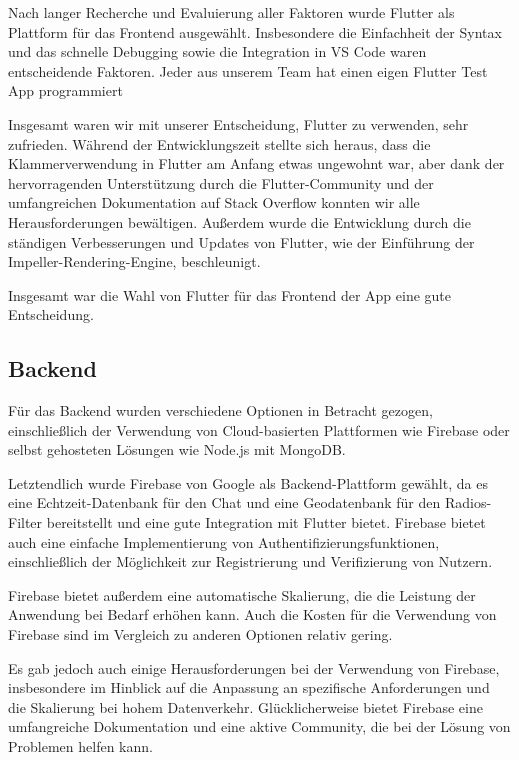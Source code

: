 Nach langer Recherche und Evaluierung aller Faktoren wurde Flutter als Plattform für das Frontend ausgewählt. Insbesondere die Einfachheit der Syntax und das schnelle Debugging sowie die Integration in VS Code waren entscheidende Faktoren. Jeder aus unserem Team hat einen eigen Flutter Test App programmiert \cite{flutter_test_apps}

Insgesamt waren wir mit unserer Entscheidung, Flutter zu verwenden, sehr zufrieden. Während der Entwicklungszeit stellte sich heraus, dass die Klammerverwendung in Flutter am Anfang etwas ungewohnt war, aber dank der hervorragenden Unterstützung durch die Flutter-Community und der umfangreichen Dokumentation auf Stack Overflow konnten wir alle Herausforderungen bewältigen. Außerdem wurde die Entwicklung durch die ständigen Verbesserungen und Updates von Flutter, wie der Einführung der Impeller-Rendering-Engine, beschleunigt. \cite{flutter_impeller}

Insgesamt war die Wahl von Flutter für das Frontend der App eine gute Entscheidung.

\subsection{Backend}

Für das Backend wurden verschiedene Optionen in Betracht gezogen, einschließlich der Verwendung von Cloud-basierten Plattformen wie Firebase oder selbst gehosteten Lösungen wie Node.js mit MongoDB.

Letztendlich wurde Firebase von Google als Backend-Plattform gewählt, da es eine Echtzeit-Datenbank für den Chat und eine Geodatenbank für den Radios-Filter bereitstellt und eine gute Integration mit Flutter bietet. Firebase bietet auch eine einfache Implementierung von Authentifizierungsfunktionen, einschließlich der Möglichkeit zur Registrierung und Verifizierung von Nutzern.

Firebase bietet außerdem eine automatische Skalierung, die die Leistung der Anwendung bei Bedarf erhöhen kann. Auch die Kosten für die Verwendung von Firebase sind im Vergleich zu anderen Optionen relativ gering.

Es gab jedoch auch einige Herausforderungen bei der Verwendung von Firebase, insbesondere im Hinblick auf die Anpassung an spezifische Anforderungen und die Skalierung bei hohem Datenverkehr. Glücklicherweise bietet Firebase eine umfangreiche Dokumentation und eine aktive Community, die bei der Lösung von Problemen helfen kann.

